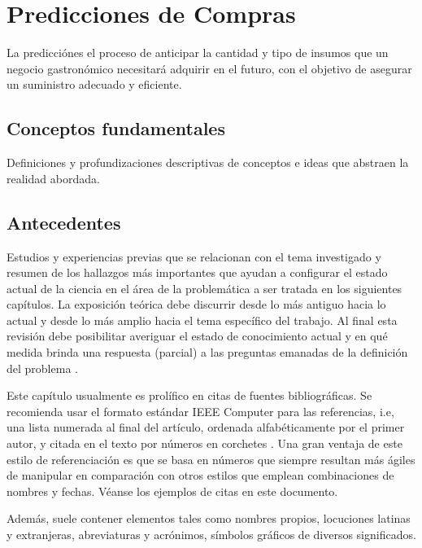 \fancyhead{}
\fancyfoot{}
\newtheorem{teorema}{Teorema}
\cfoot{\thepage}


\chapter{Predicciones de Compras}
La predicciónes el proceso de anticipar la cantidad y tipo de insumos que un negocio gastronómico necesitará adquirir en el futuro, con el objetivo de asegurar un suministro adecuado y eficiente.








\section{Conceptos fundamentales}
Definiciones y profundizaciones descriptivas de conceptos e ideas que abstraen la realidad abordada.

\section{Antecedentes}
Estudios y experiencias previas que se relacionan con el tema investigado y resumen de los hallazgos más importantes que ayudan a configurar el estado actual de la ciencia en el área de la problemática a ser tratada en los siguientes capítulos. La exposición teórica debe discurrir desde lo más antiguo hacia lo actual y desde lo más amplio hacia el tema específico del trabajo. Al final esta revisión debe posibilitar averiguar el estado de conocimiento actual y en qué medida brinda una respuesta (parcial) a las preguntas emanadas de la definición del problema \cite{sampieri}.

Este capítulo usualmente es prolífico en citas de fuentes bibliográficas. Se recomienda usar el formato estándar IEEE Computer para las referencias, i.e, una lista numerada al final del artículo, ordenada alfabéticamente por el primer autor, y citada en el texto por números en corchetes \cite{ieee}. Una gran ventaja de este estilo de referenciación es que se basa en números que siempre resultan más ágiles de manipular en comparación con otros estilos que emplean combinaciones de nombres y fechas. Véanse los ejemplos de citas en este documento.

 Además, suele contener elementos tales como nombres propios, locuciones latinas y extranjeras, abreviaturas y acrónimos, símbolos gráficos de diversos significados.

